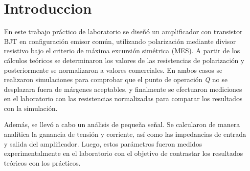 \chapter{Introduccion}

En este trabajo práctico de laboratorio se diseñó un amplificador con transistor BJT en configuración emisor común, utilizando
polarización mediante divisor resistivo bajo el criterio de máxima excursión simétrica (MES). A partir de los cálculos teóricos
se determinaron los valores de las resistencias de polarización y posteriormente se normalizaron a valores comerciales. En ambos
casos se realizaron simulaciones para comprobar que el punto de operación \emph{Q} no se desplazara fuera
de márgenes aceptables, y finalmente se efectuaron mediciones en el laboratorio con las resistencias normalizadas para comparar
los resultados con la simulación.

Además, se llevó a cabo un análisis de pequeña señal. Se calcularon de manera analítica la ganancia de tensión y corriente, así
como las impedancias de entrada y salida del amplificador. Luego, estos parámetros fueron medidos experimentalmente en el laboratorio
con el objetivo de contrastar los resultados teóricos con los prácticos.
